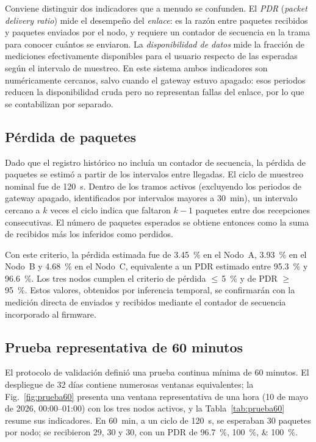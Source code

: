\documentclass[conference]{IEEEtran}
\begin{document}
Conviene distinguir dos indicadores que a menudo se confunden. El \emph{PDR} (\textit{packet delivery ratio}) mide el desempeño del \emph{enlace}: es la razón entre paquetes recibidos y paquetes enviados por el nodo, y requiere un contador de secuencia en la trama para conocer cuántos se enviaron. La \emph{disponibilidad de datos} mide la fracción de mediciones efectivamente disponibles para el usuario respecto de las esperadas según el intervalo de muestreo. En este sistema ambos indicadores son numéricamente cercanos, salvo cuando el gateway estuvo apagado: esos periodos reducen la disponibilidad cruda pero no representan fallas del enlace, por lo que se contabilizan por separado.

\subsection{Pérdida de paquetes}
\label{sec:perdida}

Dado que el registro histórico no incluía un contador de secuencia, la pérdida de paquetes se estimó a partir de los intervalos entre llegadas. El ciclo de muestreo nominal fue de \SI{120}{\second}. Dentro de los tramos activos (excluyendo los periodos de gateway apagado, identificados por intervalos mayores a \SI{30}{\minute}), un intervalo cercano a $k$ veces el ciclo indica que faltaron $k-1$ paquetes entre dos recepciones consecutivas. El número de paquetes esperados se obtiene entonces como la suma de recibidos más los inferidos como perdidos.

Con este criterio, la pérdida estimada fue de \SI{3.45}{\percent} en el Nodo~A, \SI{3.93}{\percent} en el Nodo~B y \SI{4.68}{\percent} en el Nodo~C, equivalente a un PDR estimado entre \SI{95.3}{\percent} y \SI{96.6}{\percent}. Los tres nodos cumplen el criterio de pérdida $\leq$\,\SI{5}{\percent} y de PDR $\geq$\,\SI{95}{\percent}. Estos valores, obtenidos por inferencia temporal, se confirmarán con la medición directa de enviados y recibidos mediante el contador de secuencia incorporado al firmware.

\subsection{Prueba representativa de 60 minutos}
\label{sec:prueba60}

El protocolo de validación definió una prueba continua mínima de 60 minutos. El despliegue de 32 días contiene numerosas ventanas equivalentes; la Fig.~\ref{fig:prueba60} presenta una ventana representativa de una hora (10 de mayo de 2026, 00:00--01:00) con los tres nodos activos, y la Tabla~\ref{tab:prueba60} resume sus indicadores. En \SI{60}{\minute}, a un ciclo de \SI{120}{\second}, se esperaban \num{30} paquetes por nodo; se recibieron 29, 30 y 30, con un PDR de \SIlist{96.7;100;100}{\percent}.
\end{document}
